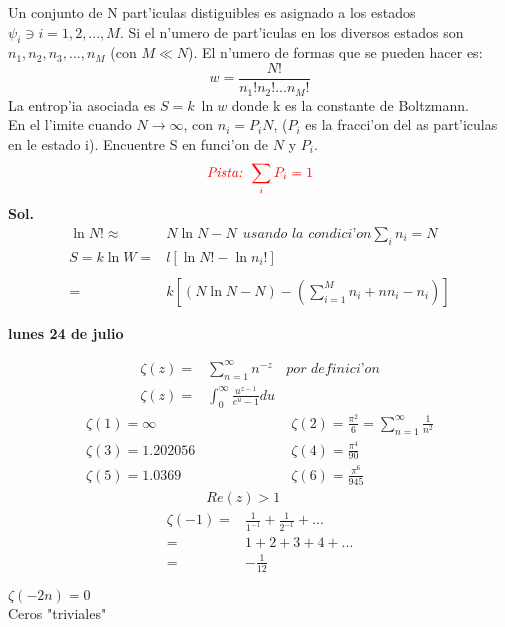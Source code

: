 \documentclass{article}
\theoremstyle{definition}
\begin{document}
Un conjunto de N part'iculas distiguibles es asignado a los estados $\psi_i\ni i=1,2,...,M$. Si el n'umero de part'iculas en los diversos estados son $n_1,n_2,n_3,...,n_M$ (con $M\ll N$). El n'umero de formas que se pueden hacer es:
\[w=\frac{N!}{n_1!n_2!...n_M!}\]
La entrop'ia asociada es $S=k\ \ln w$ donde k es la constante de Boltzmann.\\
En el l'imite cuando $N\to \infty$, con $n_i=P_i N$, ($P_i$ es la fracci'on del as part'iculas en le estado i). Encuentre S  en funci'on de $N$ y $P_i$.
\[\textcolor{red}{\textit{Pista: } \sum_iP_i=1}\] 
\textbf{Sol. }
\[
\begin{array}{rl}
	\ln N!\approx & N\ln N-N\ \ \textit{usando la condici'on} \sum_in_i=N\\
	S=k\ln W=& l \left[\ln N!- \ln n_i!\right]\\
	\\
	=& k\left[ (N\ln N-N)-\left(\sum^M_{i=1}n_i+nn_i-n_i\right)\right]
\end{array}
\]


\newpage
\textbf{lunes 24 de julio}

\[
\begin{array}{rlr}
	\zeta (z) =& \sum^{\infty}_{n=1} n^{-z} & \textit{por definici'on}\\
	\zeta (z) =& \int^{\infty}_{0}\frac{u^{z-1}}{e^u-1}du
\end{array}
\]
\[
\begin{array}{lcl}
	\zeta (1)=\infty && \zeta (2) =\frac{\pi^2}{6}=\sum^{\infty}_{n=1}\frac{1}{n^2}\\
	\zeta (3) = 1.202056 && \zeta (4)=\frac{\pi^4}{90}\\
	\zeta (5) = 1.0369 &&  \zeta (6) = \frac{\pi^6}{945}\\
	&Re(z)>1
\end{array}
\]
\hfill
\[
\begin{array}{rl}
	\zeta (-1)=& \frac{1}{1^{-1}}+\frac{1}{2^{-1}}+...\\
	=& 1+2+3+4+...\\
	=&-\frac{1}{12}
\end{array}
\]
\begin{center}
	$\zeta(-2n)=0$\\
	Ceros "triviales"
\end{center}
\end{document}
